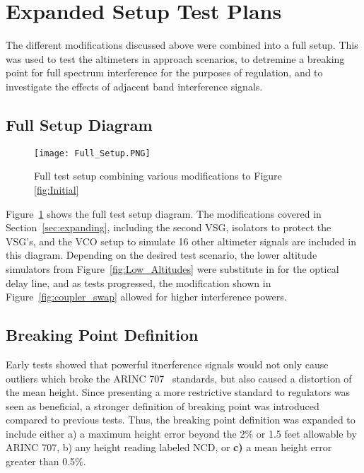 \section{Expanded Setup Test Plans}
The different modifications discussed above were combined into a full setup. This was used to test the altimeters in approach scenarios, to detremine a breaking point for full spectrum interference for the purposes of regulation, and to investigate the effects of adjacent band interference signals.
\subsection{Full Setup Diagram}
\begin{figure}[ht]
\centering
\texttt{[image: Full\_Setup.PNG]}
\caption{Full test setup combining various modifications to Figure~
\ref{fig:Initial}}

\label{fig:combined}

\end{figure}
Figure~\ref{fig:combined} shows the full test setup diagram. The modifications covered in Section~\ref{sec:expanding}, including the second VSG, isolators to protect the VSG's, and the VCO setup to simulate 16 other altimeter signals are included in this diagram. Depending on the desired test scenario, the lower altitude simulators from Figure~\ref{fig:Low_Altitudes} were substitute in for the optical delay line, and as tests progressed, the modification shown in Figure~\ref{fig:coupler_swap} allowed for higher interference powers. 

\subsection{Breaking Point Definition}
Early tests showed that powerful itnerference signals would not only cause outliers which broke the ARINC 707~\cite{noauthor_arinc_2009} standards, but also caused a distortion of the mean height. Since presenting a more restrictive standard to regulators was seen as beneficial, a stronger definition of breaking point was introduced compared to previous tests. Thus, the breaking point definition was expanded to include either a) a maximum height error beyond the 2\% or 1.5 feet allowable by ARINC 707, b) any height reading labeled NCD, or \textbf{c)} a mean height error greater than 0.5\%. 


